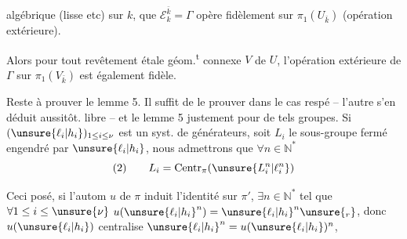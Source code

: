 
 algébrique (lisse etc) sur $k$,  que $\mathcal E_k^{\bar k}=\Gamma$ opère fidèlement sur $\pi_1(U_{\bar k})$ (opération extérieure).

Alors pour tout revêtement étale géom.\textsuperscript{t} connexe $V$ de $U$, l'opération extérieure de \deleted{\unsure{$\pi$}} $\Gamma$ sur $\pi_1(V_{\bar k})$ est également fidèle.

Reste à prouver le lemme 5. Il suffit de le prouver dans le cas respé -- l'autre s'en déduit aussitôt.    libre -- et le lemme 5  justement pour de tels groupes. Si $(\unsure{\ell_i|h_i})_{1\le i\le\nu}$ est un syst. de générateurs, soit $L_i$ le sous-groupe fermé engendré par $\unsure{\ell_i|h_i}$, nous admettrons que $\forall n\in\mathbb N^*$
\[
(2)\qquad L_i=\operatorname{Centr}_{\pi}(\unsure{L_i^n|\ell_i^n})
\]

Ceci posé, si l'autom $u$ de $\pi$ induit l'identité sur $\pi'$, $\exists n\in\mathbb N^*$ tel que $\forall 1\le i\le\unsure{\nu}$
$u(\unsure{\ell_i|h_i}^{n})=\unsure{\ell_i|h_i}^{n}\unsure{{}_r}$, donc $u(\unsure{\ell_i|h_i})$ centralise $\unsure{\ell_i|h_i}^{n}=u(\unsure{\ell_i|h_i})^{n}$,

